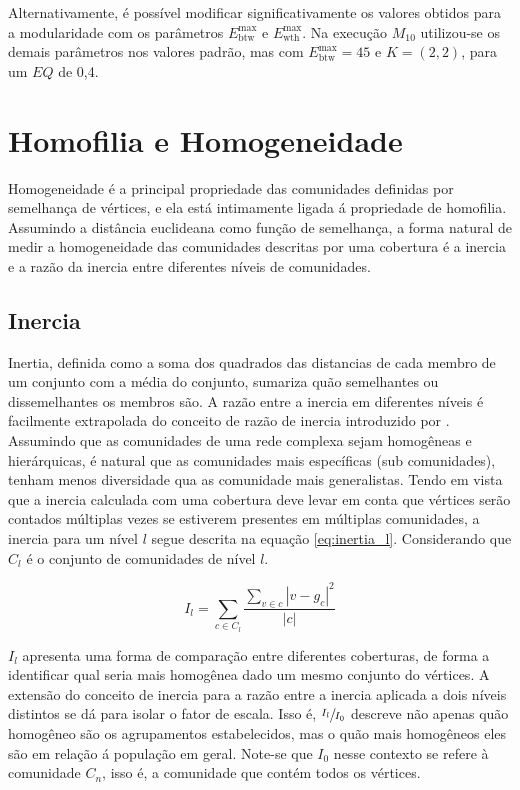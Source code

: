 \documentclass[notes.tex]{subfiles}
\begin{document}
Alternativamente, é possível modificar significativamente os valores obtidos para a modularidade com os parâmetros $E_\text{btw}^\text{max}$ e $E_\text{wth}^\text{max}$.
Na execução $M_{10}$ utilizou-se os demais parâmetros nos valores padrão, mas com $E_\text{btw}^\text{max}=45$ e $K = (2, 2)$, para um $EQ$ de 0,4.

\section{Homofilia e Homogeneidade}

Homogeneidade é a principal propriedade das comunidades definidas por semelhança de vértices, e ela está intimamente ligada á propriedade de homofilia.
Assumindo a distância euclideana como função de semelhança, a forma natural de medir a homogeneidade das comunidades descritas por uma cobertura é a inercia e a razão da inercia entre diferentes níveis de comunidades.

\subsection{Inercia}

Inertia, definida como a soma dos quadrados das distancias de cada membro de um conjunto com a média do conjunto, sumariza quão semelhantes ou dissemelhantes os membros são.
A razão entre a inercia em diferentes níveis é facilmente extrapolada do conceito de razão de inercia introduzido por .
Assumindo que as comunidades de uma rede complexa sejam homogêneas e hierárquicas, é natural que as comunidades mais específicas (sub comunidades), tenham menos diversidade qua as comunidade mais generalistas.
Tendo em vista que a inercia calculada com uma cobertura deve levar em conta que vértices serão contados múltiplas vezes se estiverem presentes em múltiplas comunidades, a inercia para um nível $l$ segue descrita na equação \ref{eq:inertia_l}.
Considerando que $C_l$ é o conjunto de comunidades de nível  $l$.

\begin{equation}\label{eq:inertia_l}
    I_l = \sum_{c \in C_l}\frac{\sum_{v \in c} |v-g_c|^2}{|c|}
\end{equation}

$I_l$ apresenta uma forma de comparação entre diferentes coberturas, de forma a identificar qual seria mais homogênea dado um mesmo conjunto do vértices.
A extensão do conceito de inercia para a razão entre a inercia aplicada a dois níveis distintos se dá para isolar o fator de escala.
Isso é, $\sfrac{I_l}{I_0}$ descreve não apenas quão homogêneo são os agrupamentos estabelecidos, mas o quão mais homogêneos eles são em relação á população em geral.
Note-se que $I_0$ nesse contexto se refere à comunidade $C_n$, isso é, a comunidade que contém todos os vértices.
\end{document}
